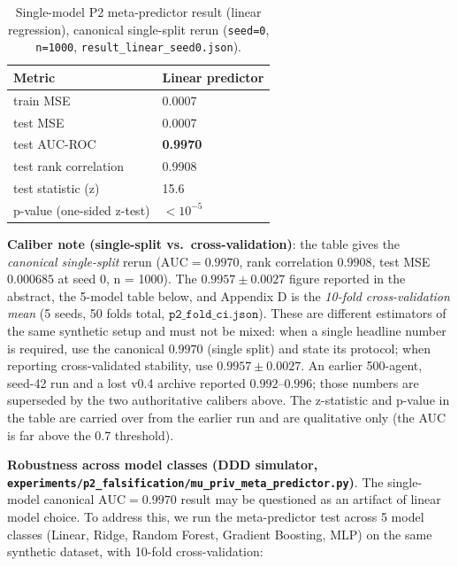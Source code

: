 \documentclass{article}
\theoremstyle{definition}
\begin{document}
\begin{table}[h]
\centering
\caption{Single-model P2 meta-predictor result (linear regression), canonical single-split rerun (\texttt{seed=0}, \texttt{n=1000}, \texttt{result\_linear\_seed0.json}).}
\label{tab:p2-single}
\begin{tabular}{ll}
\toprule
Metric & Linear predictor \\
\midrule
train MSE & 0.0007 \\
test MSE & 0.0007 \\
test AUC-ROC & \textbf{0.9970} \\
test rank correlation & 0.9908 \\
test statistic (z) & 15.6 \\
p-value (one-sided z-test) & $< 10^{-5}$ \\
\bottomrule
\end{tabular}
\end{table}

\textbf{Caliber note (single-split vs.\ cross-validation)}: the table gives the \emph{canonical single-split} rerun ($\text{AUC}=0.9970$, rank correlation $0.9908$, test MSE $0.000685$ at seed 0, n = 1000). The $0.9957\pm0.0027$ figure reported in the abstract, the 5-model table below, and Appendix D is the \emph{10-fold cross-validation mean} (5 seeds, 50 folds total, $\texttt{p2\_fold\_ci.json}$). These are different estimators of the same synthetic setup and must not be mixed: when a single headline number is required, use the canonical $0.9970$ (single split) and state its protocol; when reporting cross-validated stability, use $0.9957\pm0.0027$. An earlier 500-agent, seed-42 run and a lost v0.4 archive reported $0.992$--$0.996$; those numbers are superseded by the two authoritative calibers above. The z-statistic and p-value in the table are carried over from the earlier run and are qualitative only (the AUC is far above the 0.7 threshold).

\textbf{Robustness across model classes (DDD simulator, \texttt{experiments/p2\_falsification/mu\_priv\_meta\_predictor.py})}. The single-model canonical $\text{AUC}=0.9970$ result may be questioned as an artifact of linear model choice. To address this, we run the meta-predictor test across 5 model classes (Linear, Ridge, Random Forest, Gradient Boosting, MLP) on the same synthetic dataset, with 10-fold cross-validation:
\end{document}
